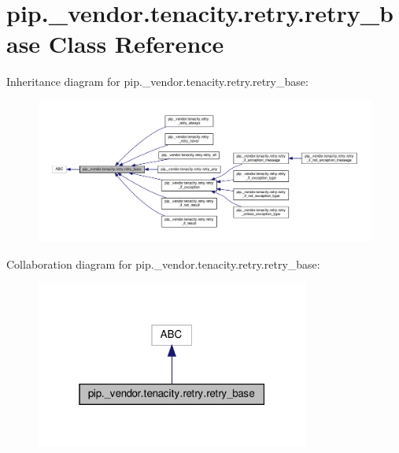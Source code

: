 \hypertarget{classpip_1_1__vendor_1_1tenacity_1_1retry_1_1retry__base}{}\section{pip.\+\_\+vendor.\+tenacity.\+retry.\+retry\+\_\+base Class Reference}
\label{classpip_1_1__vendor_1_1tenacity_1_1retry_1_1retry__base}


Inheritance diagram for pip.\+\_\+vendor.\+tenacity.\+retry.\+retry\+\_\+base\+:
\nopagebreak
\begin{figure}[H]
\begin{center}
\leavevmode
\includegraphics[width=350pt]{classpip_1_1__vendor_1_1tenacity_1_1retry_1_1retry__base__inherit__graph}
\end{center}
\end{figure}


Collaboration diagram for pip.\+\_\+vendor.\+tenacity.\+retry.\+retry\+\_\+base\+:
\nopagebreak
\begin{figure}[H]
\begin{center}
\leavevmode
\includegraphics[width=256pt]{classpip_1_1__vendor_1_1tenacity_1_1retry_1_1retry__base__coll__graph}
\end{center}
\end{figure}
